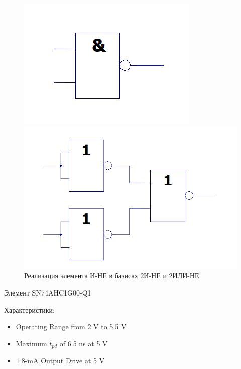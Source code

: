 \begin{figure}[H]
	\centering
	\begin{minipage}{.45\textwidth}
		\centering
		\includegraphics[width=0.85\linewidth]{imgs/1/and-not_and}
	\end{minipage}
	\begin{minipage}{.45\textwidth}
		\centering
		\includegraphics[width=0.85\linewidth]{imgs/1/and-not_or}
	\end{minipage}
	\caption{Реализация элемента И-НЕ в базисах 2И-НЕ и 2ИЛИ-НЕ}
\end{figure}

Элемент SN74AHC1G00-Q1

Характеристики:
\begin{itemize}
	\item Operating Range from 2 V to 5.5 V
	\item Maximum $t_{pd}$ of 6.5 ns at 5 V
	\item ±8-mA Output Drive at 5 V
\end{itemize}

